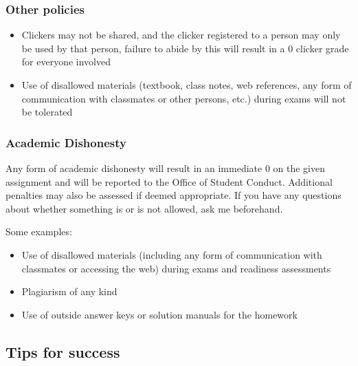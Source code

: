 \documentclass[slidestop,compress,mathserif,12pt,t,professionalfonts,xcolor=table]{beamer}
\begin{document}
\begin{frame}
\frametitle{Other policies}

\begin{itemize}

\item Clickers may not be shared, and the clicker registered to a person may only be used by that person, failure to abide by this will result in a 0 clicker grade for everyone involved

\item Use of disallowed materials (textbook, class notes, web references, any form of communication with classmates or other persons, etc.) during exams will not be tolerated

\end{itemize}


\end{frame}


\begin{frame}
\frametitle{Academic Dishonesty}

Any form of academic dishonesty will result in an immediate 0 on the given assignment and will be reported to the Office of Student Conduct. Additional penalties may also be assessed if deemed appropriate. If you have any questions about whether something is or is not allowed, ask me beforehand.

Some examples:

\begin{itemize}

\item Use of disallowed materials (including any form of communication with classmates or accessing the web) during exams and readiness assessments

\item Plagiarism of any kind

\item Use of outside answer keys or solution manuals for the homework

\end{itemize}

\end{frame}


\subsection{Tips for success}
\end{document}
